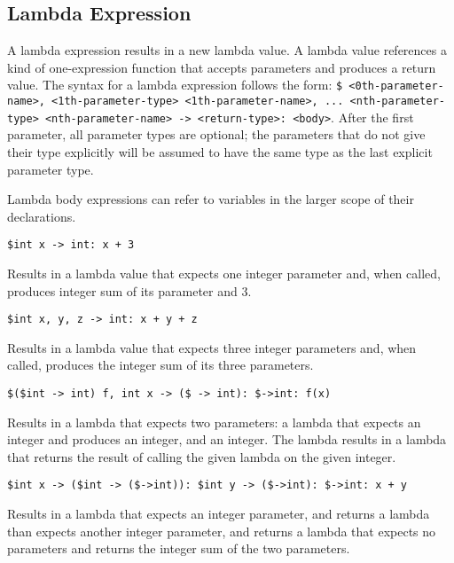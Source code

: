 
\subsection{Lambda Expression}
{
	A lambda expression results in a new lambda value.
	A lambda value references a kind of
	one-expression function that accepts parameters and produces a return value.
	The syntax for a lambda expression follows the
	form: \texttt{\$<0th-parameter-type> <0th-parameter-name>,
	<1th-parameter-type> <1th-parameter-name>, ... <nth-parameter-type>
	<nth-parameter-name> -> <return-type>: <body>}.
	After the first parameter, all parameter types are optional; the
	parameters that do not give their type explicitly will be assumed to
	have the same type as the last explicit parameter type.
	
	Lambda body expressions can refer to variables in the larger scope of their
	declarations.
	
	\begin{itemize}
	{
		\item[] \lstinline[language=MAIA, columns=fixed]@$int x -> int: x + 3@
		
			Results in a lambda value that expects
			one integer parameter and, when called, produces integer sum
			of its parameter and 3.
		
		\item[] \lstinline[language=MAIA, columns=fixed]@$int x, y, z -> int: x + y + z@
		
			Results in a lambda value that expects
			three integer parameters and, when called, produces the integer sum
			of its three parameters.
		
		\item[] \lstinline[language=MAIA, columns=fixed]@$($int -> int) f, int x -> ($ -> int): $->int: f(x)@
		
			Results in a lambda that expects two parameters:
			a lambda that expects an integer and produces an integer,
			and an integer. The lambda results in a lambda that returns the
			result of calling the given lambda on the given integer.
		
		\item[] \lstinline[language=MAIA, columns=fixed]@$int x -> ($int -> ($->int)): $int y -> ($->int): $->int: x + y@
		
			Results in a lambda that expects an integer parameter, and returns
			a lambda than expects another integer parameter, and returns
			a lambda that expects no parameters and returns the integer sum
			of the two parameters.
	}
	\end{itemize}
}














